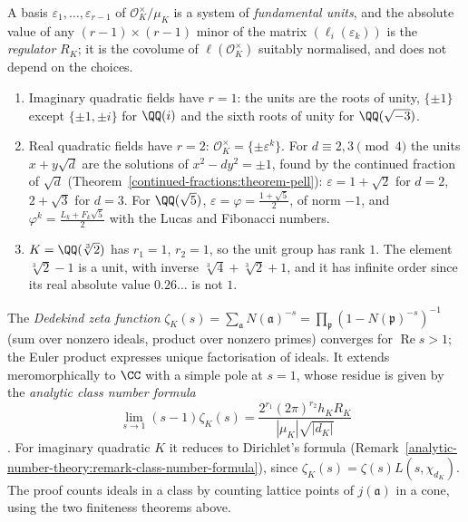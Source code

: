 A basis $\varepsilon_1, \dots, \varepsilon_{r-1}$ of $\mathcal{O}_K^\times/\mu_K$ is a system of \emph{fundamental units}, and the absolute value of any $(r - 1) \times (r - 1)$ minor of the matrix
$(\ell_i(\varepsilon_k))$ is the \emph{regulator} $R_K$; it is the covolume of $\ell(\mathcal{O}_K^\times)$ suitably normalised, and does not depend on the choices.

\begin{example}\label{algebraic-number-theory:example-units}
\begin{enumerate}
\item Imaginary quadratic fields have $r = 1$: the units are the roots of unity, $\{\pm1\}$ except $\{\pm1, \pm i\}$ for $\QQ(i)$ and the sixth roots of unity for $\QQ(\sqrt{-3})$.
\item Real quadratic fields have $r = 2$: $\mathcal{O}_K^\times = \{\pm\varepsilon^k\}$. For $d \equiv 2, 3 \pmod 4$ the units $x + y\sqrt d$ are the solutions of $x^2 - dy^2 = \pm1$, found by the continued
fraction of $\sqrt d$ (Theorem~\ref{continued-fractions:theorem-pell}): $\varepsilon = 1 + \sqrt2$ for $d = 2$, $2 + \sqrt3$ for $d = 3$. For $\QQ(\sqrt5)$, $\varepsilon = \varphi = \frac{1 + \sqrt5}{2}$, of
norm $-1$, and $\varphi^k = \frac{L_k + F_k\sqrt5}{2}$ with the Lucas and Fibonacci numbers.
\item $K = \QQ(\sqrt[3]{2})$ has $r_1 = 1$, $r_2 = 1$, so the unit group has rank $1$. The element $\sqrt[3]{2} - 1$ is a unit, with inverse $\sqrt[3]{4} + \sqrt[3]{2} + 1$, and it has infinite order since
its real absolute value $0.26\ldots$ is not $1$.
\end{enumerate}
\end{example}

\begin{remark}\label{algebraic-number-theory:remark-class-number-formula}
The \emph{Dedekind zeta function} $\zeta_K(s) = \sum_{\mathfrak{a}}N(\mathfrak{a})^{-s} = \prod_{\mathfrak{p}}(1 - N(\mathfrak{p})^{-s})^{-1}$ (sum over nonzero ideals, product over nonzero primes) converges for
$\operatorname{Re}s > 1$; the Euler product expresses unique factorisation of ideals. It extends meromorphically to $\CC$ with a simple pole at $s = 1$, whose residue is given by the \emph{analytic class
number formula}
\[
\lim_{s \to 1}(s - 1)\zeta_K(s) = \frac{2^{r_1}(2\pi)^{r_2}h_KR_K}{|\mu_K|\sqrt{|d_K|}}
\]
\cite[Chapter VII, Corollary 5.11]{neukirch-ant}. For imaginary quadratic $K$ it reduces to Dirichlet's formula (Remark~\ref{analytic-number-theory:remark-class-number-formula}), since
$\zeta_K(s) = \zeta(s)L(s, \chi_{d_K})$. The proof counts ideals in a class by counting lattice points of $j(\mathfrak{a})$ in a cone, using the two finiteness theorems above.
\end{remark}

